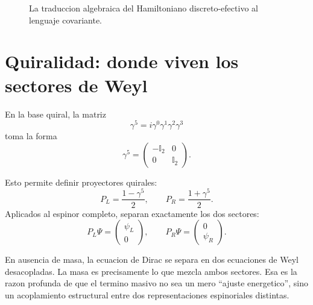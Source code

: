 \begin{figure}[h!]
\centering
{}
\caption{La traduccion algebraica del Hamiltoniano discreto-efectivo al lenguaje covariante.}
\end{figure}

\section{Quiralidad: donde viven los sectores de Weyl}
En la base quiral, la matriz
\begin{equation}
\gamma^5 = i\gamma^0\gamma^1\gamma^2\gamma^3
\end{equation}
toma la forma
\begin{equation}
\gamma^5=
\begin{pmatrix}
-\mathbb{I}_2 & 0\\
0 & \mathbb{I}_2
\end{pmatrix}.
\label{c15:eq:gamma5}
\end{equation}

Esto permite definir proyectores quirales:
\begin{equation}
P_L = \frac{1-\gamma^5}{2},
\qquad
P_R = \frac{1+\gamma^5}{2}.
\end{equation}
Aplicados al espinor completo, separan exactamente los dos sectores:
\begin{equation}
P_L\Psi=
\begin{pmatrix}
\psi_L\\
0
\end{pmatrix},
\qquad
P_R\Psi=
\begin{pmatrix}
0\\
\psi_R
\end{pmatrix}.
\end{equation}

En ausencia de masa, la ecuacion de Dirac se separa en dos ecuaciones de Weyl desacopladas. La masa es precisamente lo que mezcla ambos sectores. Esa es la razon profunda de que el termino masivo no sea un mero \enquote{ajuste energetico}, sino un acoplamiento estructural entre dos representaciones espinoriales distintas.

